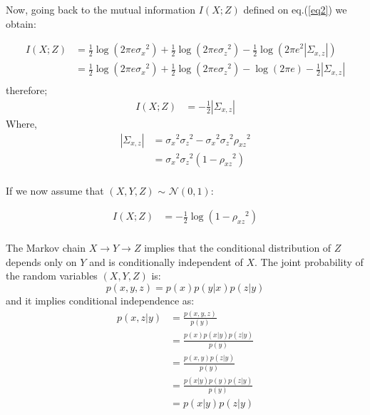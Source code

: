 \documentclass[11pt]{article}
\makeatletter
\newcommand\pN{\mathcal{N}}
\newenvironment{proofw}{\par
	\pushQED{\qed}%
	\normalfont \topsep6\p@\@plus6\p@\relax
	\trivlist
	\item[]\ignorespaces
}{%
	\popQED\endtrivlist\@endpefalse
}
\makeatother
\begin{document}
\begin{proofw}
Now, going back to the mutual information $I(X;Z)$ defined on eq.(\ref{eq2}) we obtain:

\begin{equation*}
\begin{split}
I(X;Z) & = \frac{1}{2}\log(2\pi e {\sigma_{x}}^2) + \frac{1}{2}\log(2\pi e {\sigma_{z}}^2) - \frac{1}{2}\log({2\pi e }^2|\Sigma_{x,z}|)\\
	&= \frac{1}{2}\log(2\pi e {\sigma_{x}}^2) + \frac{1}{2}\log(2\pi e {\sigma_{z}}^2) - \log(2\pi e ) - \frac{1}{2}|\Sigma_{x,z}|\\
\end{split}
\end{equation*}
therefore;
\begin{equation*}
\begin{split}
I(X;Z) & =  - \frac{1}{2}|\Sigma_{x,z}|
\end{split}
\end{equation*}
Where,
\begin{equation*}
\begin{split}
|\Sigma_{x,z}| & = {\sigma_{x}}^2 {\sigma_{z}}^2 - {\sigma_{x}}^2{\sigma_{z}}^2{\rho_{xz}}^2\\
			& = {\sigma_{x}}^2{\sigma_{z}}^2(1-{\rho_{xz}}^2)\\
\end{split}
\end{equation*}

If we now assume that $(X,Y,Z)$ $\sim$ $\pN(0,1)$:

\begin{equation}\label{eq5}
\begin{split}
I(X;Z) & =  -\frac{1}{2}\log	(1 - {\rho_{xz}}^2)\\
\end{split}
\end{equation}

The Markov chain $X \rightarrow Y \rightarrow Z $ implies that the conditional distribution of $Z$ depends only on $Y$ and is conditionally independent of $X$. The joint probability of the random variables $(X, Y, Z)$ is:
\begin{equation*}
p(x,y,z) = p(x)p(y|x)p(z|y)
\end{equation*}
and it implies conditional independence as:
\begin{equation}\label{eq4}
\begin{split}
p(x,z|y) & = \frac{p(x,y,z)}{p(y)}\\
		& = \frac{p(x)p(x|y)p(z|y)}{p(y)}\\
		& = \frac{p(x,y)p(z|y)}{p(y)}\\
		& = \frac{p(x|y)p(y)p(z|y)}{p(y)}\\
		& = p(x|y)p(z|y)
\end{split}
\end{equation}
 

\end{proofw}
\end{document}
